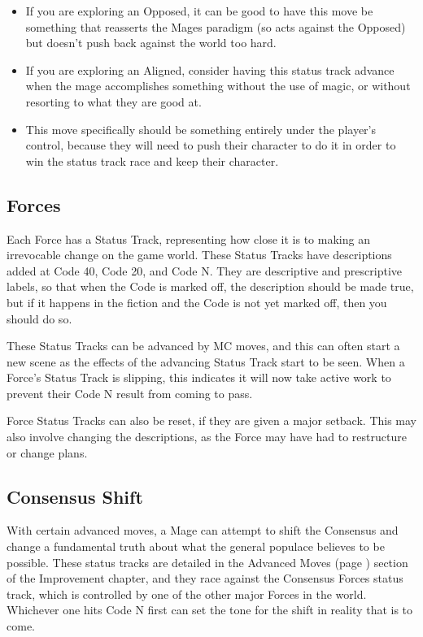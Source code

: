 \documentclass[
]{article}
\begin{document}
\begin{itemize}
  \begin{itemize}
  \item
    If you are exploring an Opposed, it can be good to have this move be
    something that reasserts the Mages paradigm (so acts against the
    Opposed) but doesn't push back against the world too hard.
  \item
    If you are exploring an Aligned, consider having this status track
    advance when the mage accomplishes something without the use of
    magic, or without resorting to what they are good at.
  \item
    This move specifically should be something entirely under the
    player's control, because they will need to push their character to
    do it in order to win the status track race and keep their
    character.
  \end{itemize}
\end{itemize}

\hypertarget{forces-1}{%
\subsection{Forces}\label{forces-1}}

Each Force has a Status Track, representing how close it is to making an
irrevocable change on the game world. These Status Tracks have
descriptions added at Code 40, Code 20, and Code N. They are descriptive
and prescriptive labels, so that when the Code is marked off, the
description should be made true, but if it happens in the fiction and
the Code is not yet marked off, then you should do so.

These Status Tracks can be advanced by MC moves, and this can often
start a new scene as the effects of the advancing Status Track start to
be seen. When a Force's Status Track is slipping, this indicates it will
now take active work to prevent their Code N result from coming to pass.

Force Status Tracks can also be reset, if they are given a major
setback. This may also involve changing the descriptions, as the Force
may have had to restructure or change plans.

\hypertarget{consensus-shift}{%
\subsection{Consensus Shift}\label{consensus-shift}}

With certain advanced moves, a Mage can attempt to shift the Consensus and change a fundamental truth about what the general populace believes to be possible. These status tracks are detailed in the Advanced Moves (page \pageref{Advanced Moves}) section of the Improvement chapter, and they race against the Consensus Forces status track, which is controlled by one of the other major Forces in the world. Whichever one hits Code N first can set the tone for the shift in reality that is to come.
\end{document}
